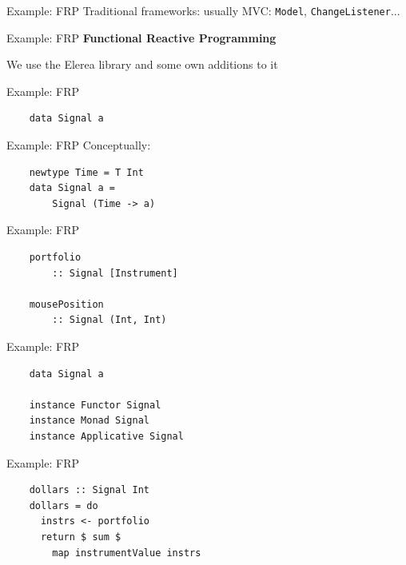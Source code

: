 \documentclass[20pt]{beamer}
\newcommand{\vspaced}{
    \vspace{5mm}
}
\begin{document}
\begin{frame}{Example: FRP}
    Traditional frameworks: usually MVC: \texttt{Model},
    \texttt{ChangeListener}...
\end{frame}

\begin{frame}{Example: FRP}
    \textbf{Functional Reactive Programming} \\
    \vspaced
    We use the Elerea library and some own additions to it
\end{frame}

\begin{frame}[fragile]{Example: FRP}
    \begin{lstlisting}
    data Signal a
    \end{lstlisting}
\end{frame}

\begin{frame}[fragile]{Example: FRP}
    Conceptually: \\
    \vspaced
    \begin{lstlisting}
    newtype Time = T Int
    data Signal a =
        Signal (Time -> a)
    \end{lstlisting}
\end{frame}

\begin{frame}[fragile]{Example: FRP}
    \begin{lstlisting}
    portfolio
        :: Signal [Instrument]

    mousePosition
        :: Signal (Int, Int)
    \end{lstlisting}
\end{frame}

\begin{frame}[fragile]{Example: FRP}
    \begin{lstlisting}
    data Signal a

    instance Functor Signal
    instance Monad Signal
    instance Applicative Signal
    \end{lstlisting}
\end{frame}

\begin{frame}[fragile]{Example: FRP}
    \begin{lstlisting}
    dollars :: Signal Int
    dollars = do
      instrs <- portfolio
      return $ sum $
        map instrumentValue instrs
    \end{lstlisting}
\end{frame}
\end{document}
